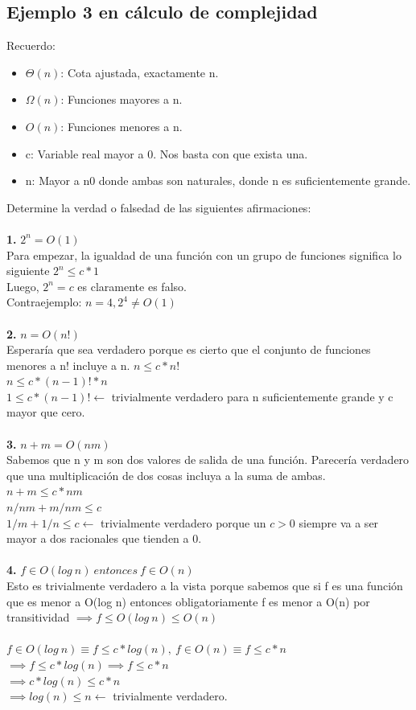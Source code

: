 \documentclass[10pt,a4paper]{article}
\begin{document}
\subsection*{Ejemplo 3 en cálculo de complejidad}
Recuerdo:
\begin{itemize}
    \item $\Theta(n)$: Cota ajustada, exactamente n. 
    \item $\Omega(n)$: Funciones mayores a n.
    \item $O(n)$: Funciones menores a n.
    \item c: Variable real mayor a 0. Nos basta con que exista una. 
    \item n: Mayor a n0 donde ambas son naturales, donde n es suficientemente grande.
\end{itemize}
Determine la verdad o falsedad de las siguientes afirmaciones: \\ \\ 
\textbf{1.} $ 2^{n} = O(1) $ \\
Para empezar, la igualdad de una función con un grupo de funciones significa lo siguiente $ 2^{n} \le c \ast 1 $ \\ 
Luego, $ 2^{n} = c $ es claramente es falso. \\ 
Contraejemplo: $ n = 4, 2^4 \neq O(1)$ \\ \\
\textbf{2.} $ n = O(n!) $ \\
Esperaría que sea verdadero porque es cierto que el conjunto de funciones menores a n! incluye a n.
$ n \le c * n!$ \\
$ n \le c * (n-1)! * n$ \\
$ 1 \le c * (n-1)! \leftarrow $ trivialmente verdadero para n suficientemente grande y c mayor que cero.\\ \\
\textbf{3.} $ n+m = O(nm) $ \\
Sabemos que n y m son dos valores de salida de una función. Parecería verdadero que una multiplicación de dos cosas incluya a la suma de ambas. \\
$ n+m \le c * nm $ \\
$ n/nm + m/nm \le c $ \\
$ 1/m + 1/n \le c \leftarrow $ trivialmente verdadero porque un $c>0$ siempre va a ser mayor a dos racionales que tienden a 0. \\ \\ 
\textbf{4.} $ f \in O(log \ n) \ entonces \ f \in O(n) $ \\
Esto es trivialmente verdadero a la vista porque sabemos que si f es una función que es menor a O(log n) entonces obligatoriamente f es menor a O(n) por transitividad $ \implies f \le O(log \ n) \le O(n) $ \\ \\  
$ f \in O(log \ n) \equiv f \le c * log(n), \ f \in O(n) \equiv f \le c * n $ \\
$ \implies f \le c * log(n) \implies f \le c * n $ \\
$ \implies c * log(n) \le c * n $ \\
$ \implies log(n) \le n \leftarrow $ trivialmente verdadero.
\end{document}
